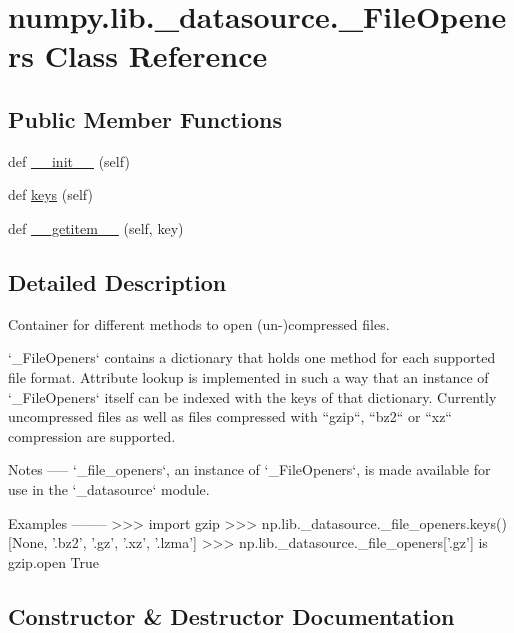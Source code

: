 \hypertarget{classnumpy_1_1lib_1_1__datasource_1_1__FileOpeners}{}\section{numpy.\+lib.\+\_\+datasource.\+\_\+\+File\+Openers Class Reference}
\label{classnumpy_1_1lib_1_1__datasource_1_1__FileOpeners}
\subsection*{Public Member Functions}
\begin{DoxyCompactItemize}
\item 
def \hyperlink{classnumpy_1_1lib_1_1__datasource_1_1__FileOpeners_a7a3adc67f45952f6b3988a0e13e2a00f}{\+\_\+\+\_\+init\+\_\+\+\_\+} (self)
\item 
def \hyperlink{classnumpy_1_1lib_1_1__datasource_1_1__FileOpeners_ab8ed8bfb9853ef411ec0fd46af9b882b}{keys} (self)
\item 
def \hyperlink{classnumpy_1_1lib_1_1__datasource_1_1__FileOpeners_afca9742121027603bd423c5cd25dcc21}{\+\_\+\+\_\+getitem\+\_\+\+\_\+} (self, key)
\end{DoxyCompactItemize}


\subsection{Detailed Description}
\begin{DoxyVerb}Container for different methods to open (un-)compressed files.

`_FileOpeners` contains a dictionary that holds one method for each
supported file format. Attribute lookup is implemented in such a way
that an instance of `_FileOpeners` itself can be indexed with the keys
of that dictionary. Currently uncompressed files as well as files
compressed with ``gzip``, ``bz2`` or ``xz`` compression are supported.

Notes
-----
`_file_openers`, an instance of `_FileOpeners`, is made available for
use in the `_datasource` module.

Examples
--------
>>> import gzip
>>> np.lib._datasource._file_openers.keys()
[None, '.bz2', '.gz', '.xz', '.lzma']
>>> np.lib._datasource._file_openers['.gz'] is gzip.open
True\end{DoxyVerb}
 

\subsection{Constructor \& Destructor Documentation}
\mbox{\label{classnumpy_1_1lib_1_1__datasource_1_1__FileOpeners_a7a3adc67f45952f6b3988a0e13e2a00f}} 
